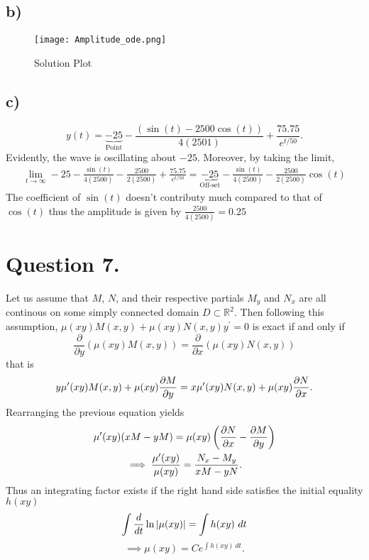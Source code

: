 \documentclass[
	12pt,
	]{article}
\newcommand{\R}{\mathbb{R}}
\theoremstyle{definition}
\theoremstyle{definition}
\theoremstyle{definition}
\theoremstyle{definition}
\theoremstyle{definition}
\theoremstyle{example}
\theoremstyle{note}
\theoremstyle{remark}
\theoremstyle{example}
\begin{document}
				\subsection{b) }
					\begin{figure}[t]
						\texttt{[image: Amplitude\_ode.png]}
						\caption{Solution Plot}
					\end{figure}
				\subsection{c) }
				 $$ y(t) = \underbrace{-25 }_{\text{Point}} -\frac{(\sin(t)-2500\cos(t))}{4(2501)}+\frac{75.75}{e^{t/50}}. $$
				 Evidently, the wave is oscillating about $-25$. Moreover, by taking the limit, 
				 \begin{align*} \lim_{t \to \infty} -25 -\frac{\sin(t)}{4(2500)} - \frac{2500}{2(2500)} + \frac{75.75}{e^{t/50}} = \underbrace{-25}_{\text{Off-set}} -\frac{\sin(t)}{4(2500)} - \frac{2500}{2(2500)}\cos(t)  
				  \end{align*}
				  The coefficient of $\sin(t)$ doesn't contributy much compared to that of $\cos(t)$ thus the amplitude is given by $\frac{2500}{4(2500)} = 0.25$
			\section{Question 7. }
				Let us assume that $M$, $N$, and their respective partials $M_{y}$ and $N_{x}$ are all continous on some simply connected domain $D\subset \R^{2}$.
				Then following this assumption, $ \mu(xy) M(x,y) + \mu(xy)N(x,y)y^{\prime} =0 $ is exact if and only if 
				\begin{equation*}
					\frac{\partial}{\partial y} (\mu(xy)M(x,y)) = \frac{\partial}{\partial x} (\mu(xy)N(x,y))
				\end{equation*}	
				that is 
				\begin{equation*}
					y \mu^{\prime}(xy) M(x,y) + \mu(xy) \pdv{M}{y} = x\mu^{\prime}(xy) N(x,y) + \mu(xy)\pdv{N}{x}.
				\end{equation*}
				Rearranging the previous equation yields 
				\begin{gather*}
					\mu^{\prime}(xy)(xM - yM) = \mu(xy)\left(\pdv{N}{x} - \pdv{M}{y}\right)\\
					\implies \frac{\mu^{\prime}(xy)}{\mu(xy)} = \frac{N_{x} - M_{y}}{xM - yN}.
				\end{gather*}
				Thus an integrating factor exists if the right hand side satisfies the initial equality $h(xy)$
				\begin{equation*}
				\int \frac{d}{dt} \ln \abs{\mu(xy)} = \int h(xy) \ dt 
				\end{equation*}
				\begin{equation*}
					\implies \mu(xy) = C e^{\int h(xy) \ dt}.
				\end{equation*}
\end{document}
